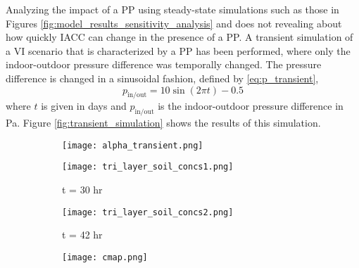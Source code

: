 \documentclass[journal=esthag,manuscript=article]{achemso}
\begin{document}
Analyzing the impact of a PP using steady-state simulations such as those in Figures \ref{fig:model_results_sensitivity_analysis} and does not revealing about how quickly IACC can change in the presence of a PP.
A transient simulation of a VI scenario that is characterized by a PP has been performed, where only the indoor-outdoor pressure difference was temporally changed.
The pressure difference is changed in a sinusoidal fashion, defined by \eqref{eq:p_transient},
\begin{equation}
  \label{eq:p_transient}
  p_\mathrm{in/out} = 10 \sin{(2 \pi t)} - 0.5
\end{equation}
where $t$ is given in days and $p_\mathrm{in/out}$ is the indoor-outdoor pressure difference in Pa.
Figure \ref{fig:transient_simulation} shows the results of this simulation.

\begin{figure}
  \caption{Transient response of TCE in indoor air (as attenuation factor) and in the surrounding soil \& gravel sub-base for a PP VI scenario subject to sinusoidal indoor-outdoor pressure fluctuations.
  \ref{fig:alpha_response} shows the attenuation factor and indoor-outdoor pressure across time.
  Figures \ref{fig:soil_30_hr} \& \ref{fig:soil_42_hr} show the contaminant concentration (normalized to the contaminant vapor in equilibrium with groundwater) in the surrounding soil \& gravel sub-base at different depths and times.}
  \label{fig:transient_simulation}
  \begin{subfigure}[t]{0.75\textwidth}
    \caption{ }
    \label{fig:alpha_response}
    \texttt{[image: alpha\_transient.png]}
  \end{subfigure}
  \begin{subfigure}[c]{0.45\textwidth}
    \caption{t = 30 hr}
    \label{fig:soil_30_hr}
    \texttt{[image: tri\_layer\_soil\_concs1.png]}
  \end{subfigure}
  \begin{subfigure}[c]{0.45\textwidth}
    \caption{t = 42 hr}
    \label{fig:soil_42_hr}
    \texttt{[image: tri\_layer\_soil\_concs2.png]}
  \end{subfigure}
  \begin{subfigure}[c]{0.05\textwidth}
    \texttt{[image: cmap.png]}
  \end{subfigure}
\end{figure}
\end{document}
